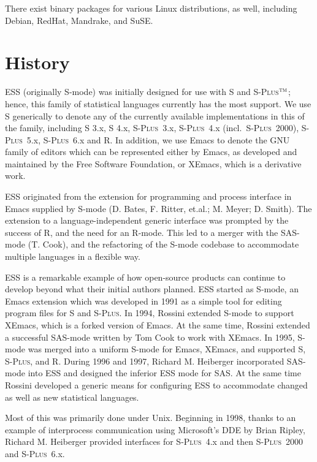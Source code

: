 \documentclass{article}
\newcommand*{\Splus}{\textsc{S-Plus}}
\newcommand{\tm}{$^{\mbox{\scriptsize\sc tm}}$}
\begin{document}
There exist binary packages for various Linux distributions, as well,
including Debian, RedHat, Mandrake, and SuSE.

\section{History}
\label{sec:history}

ESS (originally S-mode) was initially designed for use with S and
\Splus\tm; hence, this family of statistical languages currently has
the most support.  We use S generically to denote any of the currently
available implementations in this of the family, including S 3.x, S
4.x, \Splus~3.x, \Splus~4.x (incl.\ \Splus~2000), \Splus~5.x,
\Splus~6.x and R.  In addition, we use Emacs to denote the GNU family
of editors which can be represented either by Emacs, as developed and
maintained by the Free Software Foundation, or XEmacs, which is a
derivative work.

ESS originated from the extension for programming and process
interface in Emacs supplied by S-mode (D. Bates, F. Ritter, et.al.; 
M. Meyer; D. Smith).  The extension to a language-independent generic
interface was prompted by the success of R, and the need for an
R-mode.  This led to a merger with the SAS-mode (T. Cook), and the
refactoring of the S-mode codebase to accommodate multiple languages
in a flexible way.

ESS is a remarkable example of how open-source products can continue
to develop beyond what their initial authors planned.  ESS started as
S-mode, an Emacs extension which was developed in 1991 as a simple
tool for editing program files for S and \Splus.  In 1994, Rossini
extended S-mode to support XEmacs, which is a forked version of
Emacs.  At the same time, Rossini extended a successful SAS-mode
written by Tom Cook to work with XEmacs.  In 1995, S-mode was merged
into a uniform S-mode for Emacs, XEmacs, and supported S, \Splus, and
R.  During 1996 and 1997, Richard M. Heiberger incorporated 
SAS-mode into ESS and designed the inferior ESS mode for SAS.
At the same time Rossini developed a
generic means for configuring ESS to accommodate changed as well as
new statistical languages.

Most of this was primarily done under Unix.  Beginning in 1998, thanks
to an example of interprocess communication using Microsoft's DDE by
Brian Ripley, Richard M. Heiberger provided interfaces for \Splus~4.x
and then \Splus~2000 and \Splus~6.x.  
\end{document}
